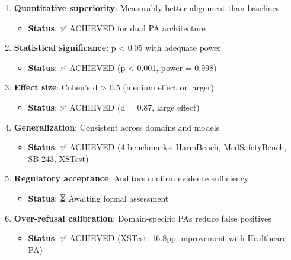\begin{enumerate}
\def\labelenumi{\arabic{enumi}.}
\tightlist
\item
  \textbf{Quantitative superiority}: Measurably better alignment than
  baselines

  \begin{itemize}
  \tightlist
  \item
    \textbf{Status}: ✅ ACHIEVED for dual PA architecture
  \end{itemize}
\item
  \textbf{Statistical significance}: p \textless{} 0.05 with adequate
  power

  \begin{itemize}
  \tightlist
  \item
    \textbf{Status}: ✅ ACHIEVED (p \textless{} 0.001, power = 0.998)
  \end{itemize}
\item
  \textbf{Effect size}: Cohen's d \textgreater{} 0.5 (medium effect or
  larger)

  \begin{itemize}
  \tightlist
  \item
    \textbf{Status}: ✅ ACHIEVED (d = 0.87, large effect)
  \end{itemize}
\item
  \textbf{Generalization}: Consistent across domains and models

  \begin{itemize}
  \tightlist
  \item
    \textbf{Status}: ✅ ACHIEVED (4 benchmarks: HarmBench,
    MedSafetyBench, SB 243, XSTest)
  \end{itemize}
\item
  \textbf{Regulatory acceptance}: Auditors confirm evidence sufficiency

  \begin{itemize}
  \tightlist
  \item
    \textbf{Status}: ⏳ Awaiting formal assessment
  \end{itemize}
\item
  \textbf{Over-refusal calibration}: Domain-specific PAs reduce false
  positives

  \begin{itemize}
  \tightlist
  \item
    \textbf{Status}: ✅ ACHIEVED (XSTest: 16.8pp improvement with
    Healthcare PA)
  \end{itemize}
\end{enumerate}

